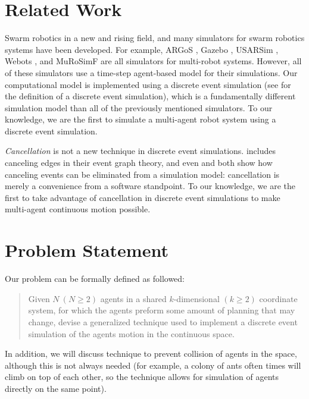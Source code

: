\documentclass[conference,letterpaper]{IEEEtran}
\let\ge=\geqslant
\begin{document}
\section{Related Work}
\label{sec:related}

Swarm robotics in a new and rising field, and many simulators for swarm
robotics systems have been developed. For example, ARGoS \cite{argos}, Gazebo
\cite{gazebo}, USARSim \cite{usarsim}, Webots \cite{webots}, and MuRoSimF
\cite{murosimf} are all simulators for multi-robot systems. However, all of
these simulators use a time-step agent-based model for their simulations. Our
computational model is implemented using a discrete event simulation (see
\cite[p.~3]{leemispark} for the definition of a discrete event simulation),
which is a fundamentally different simulation model than all of the previously
mentioned simulators. To our knowledge, we are the first to simulate a
multi-agent robot system using a discrete event simulation.

\emph{Cancellation} is not a new technique in discrete event simulations.
\cite{schruben1983} includes canceling edges in their event graph theory, and
even \cite{elimcancel1} and \cite{elimcancel2} both show how canceling events
can be eliminated from a simulation model: cancellation is merely a convenience
from a software standpoint. To our knowledge, we are the first to take
advantage of cancellation in discrete event simulations to make multi-agent
continuous motion possible.

\section{Problem Statement}
\label{sec:statement}

Our problem can be formally defined as followed:

\begin{quote}
    Given $N\ (N \ge 2)$ agents in a shared $k$-dimensional $(k \ge 2)$
    coordinate system, for which the agents preform some amount of planning
    that may change, devise a generalized technique used to implement a
    discrete event simulation of the agents motion in the continuous space.
\end{quote}

In addition, we will discuss technique to prevent collision of agents in the
space, although this is not always needed (for example, a colony of ants often
times will climb on top of each other, so the technique allows for simulation
of agents directly on the same point).
\end{document}
